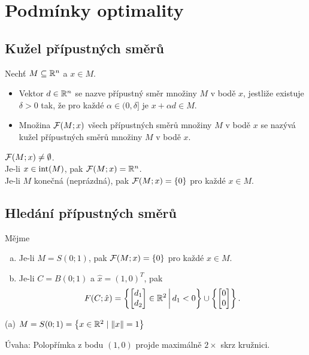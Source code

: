 \section{Podmínky optimality}

\subsection{Kužel přípustných směrů}
Nechť $M \subseteq \mathbb{R}^n$ a $x \in M$.
\begin{itemize}
    \item Vektor $d \in \mathbb{R}^n$ se nazve přípustný směr množiny $M$ v bodě $x$, jestliže existuje $\delta > 0$ tak, že pro
    každé $\alpha \in (0, \delta]$ je $x + \alpha d \in M$.
    \item Množina $\mathcal{F}(M; x)$ všech přípustných směrů množiny $M$ v bodě $x$ se nazývá kužel přípustných směrů množiny
    $M$ v bodě $x$.
\end{itemize}
$\mathcal{F}(M; x) \not = \emptyset$.\\
Je-li $x \in \operatorname*{int}(M)$, pak $\mathcal{F}(M; x) = \mathbb{R}^n$.\\
Je-li $M$ konečná (neprázdná), pak $\mathcal{F}(M;x) = \left\lbrace 0 \right\rbrace$ pro každé $x \in M$.

\subsection{Hledání přípustných směrů}
Mějme
\begin{enumerate}[(a)]
    \item Je-li $M = S(0; 1)$, pak $\mathcal{F}(M;x) = \left\lbrace 0 \right\rbrace$ pro každé $x \in M$.
    \item Je-li $C = B(0; 1)$ a $\hat x = (1, 0)^T$, pak
    \[
        F(C; \hat x) = \left\lbrace 
            \begin{bmatrix}
                d_1 \\
                d_2
            \end{bmatrix} \in \mathbb{R}^2 \, \middle| \, d_1 < 0
         \right\rbrace \cup \left\lbrace 
            \begin{bmatrix}
                0 \\
                0
            \end{bmatrix}
         \right\rbrace.
    \]
\end{enumerate}
(a) $M = S(0; 1) = \left\lbrace x \in \mathbb{R}^2 \mid \| x\| = 1 \right\rbrace$

Úvaha: Polopřímka z bodu $(1,0)$ projde maximálně $2 \times$ skrz kružnici.

